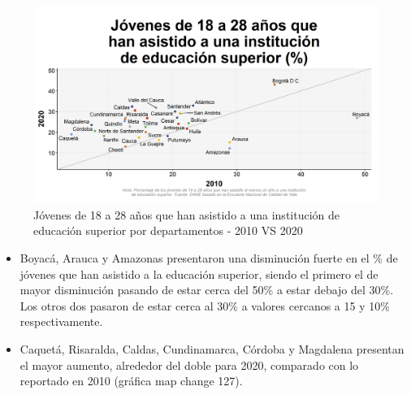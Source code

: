     \begin{figure}[H]
        \caption{Jóvenes de 18 a 28 años que han asistido a una institución de educación superior por departamentos - 2010 VS 2020 \label{map_result_2} }
        \begin{center}
        \includegraphics[width=\textwidth,keepaspectratio]{img/var_127_scatter_time.png}
        \end{center}
    \end{figure}
            \begin{itemize}
                \item Boyacá, Arauca y Amazonas presentaron una disminución fuerte en el \% de jóvenes que han asistido a la educación superior, siendo el primero el de mayor disminución pasando de estar cerca del 50\% a estar debajo del 30\%. Los otros dos pasaron de estar cerca al 30\% a valores cercanos a 15 y 10\% respectivamente.
                \item Caquetá, Risaralda, Caldas, Cundinamarca, Córdoba y Magdalena presentan el mayor aumento, alrededor del doble para 2020, comparado con lo reportado en 2010 (gráfica map change 127).
                \end{itemize}

